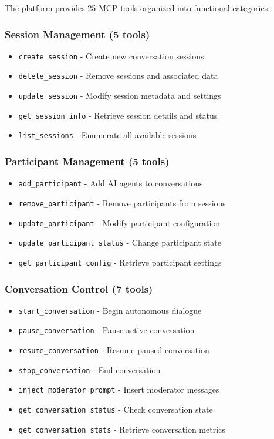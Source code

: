 \documentclass[11pt,letterpaper]{article}
\begin{document}
The platform provides 25 MCP tools organized into functional categories:

\subsubsection{Session Management (5 tools)}
\begin{itemize}
    \item \texttt{create\_session} - Create new conversation sessions
    \item \texttt{delete\_session} - Remove sessions and associated data
    \item \texttt{update\_session} - Modify session metadata and settings
    \item \texttt{get\_session\_info} - Retrieve session details and status
    \item \texttt{list\_sessions} - Enumerate all available sessions
\end{itemize}

\subsubsection{Participant Management (5 tools)}
\begin{itemize}
    \item \texttt{add\_participant} - Add AI agents to conversations
    \item \texttt{remove\_participant} - Remove participants from sessions
    \item \texttt{update\_participant} - Modify participant configuration
    \item \texttt{update\_participant\_status} - Change participant state
    \item \texttt{get\_participant\_config} - Retrieve participant settings
\end{itemize}

\subsubsection{Conversation Control (7 tools)}
\begin{itemize}
    \item \texttt{start\_conversation} - Begin autonomous dialogue
    \item \texttt{pause\_conversation} - Pause active conversation
    \item \texttt{resume\_conversation} - Resume paused conversation
    \item \texttt{stop\_conversation} - End conversation
    \item \texttt{inject\_moderator\_prompt} - Insert moderator messages
    \item \texttt{get\_conversation\_status} - Check conversation state
    \item \texttt{get\_conversation\_stats} - Retrieve conversation metrics
\end{itemize}
\end{document}
